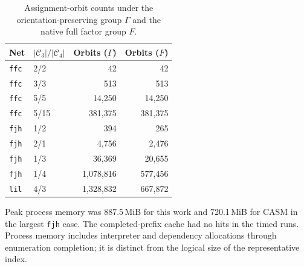 \documentclass[a5paper, 10pt]{article}
\begin{document}
\begin{table}[H]
\centering\scriptsize
\caption{Assignment-orbit counts under the orientation-preserving group $\Gamma$ and the native full factor group $F$.}
\begin{tabular}{llrr}
\toprule
Net & $|\mathcal C_3|/|\mathcal C_4|$ & Orbits ($\Gamma$) & Orbits ($F$) \\
\midrule
\texttt{ffc} & 2/2 & 42 & 42 \\
\texttt{ffc} & 3/3 & 513 & 513 \\
\texttt{ffc} & 5/5 & 14,250 & 14,250 \\
\texttt{ffc} & 5/15 & 381,375 & 381,375 \\
\texttt{fjh} & 1/2 & 394 & 265 \\
\texttt{fjh} & 2/1 & 4,756 & 2,476 \\
\texttt{fjh} & 1/3 & 36,369 & 20,655 \\
\texttt{fjh} & 1/4 & 1,078,816 & 577,456 \\
\texttt{lil} & 4/3 & 1,328,832 & 667,872 \\
\bottomrule
\end{tabular}
\end{table}

Peak process memory was 887.5\,MiB for this work and 720.1\,MiB for CASM in the largest \texttt{fjh} case. The completed-prefix cache had no hits in the timed runs. Process memory includes interpreter and dependency allocations through enumeration completion; it is distinct from the logical size of the representative index.
\end{document}
